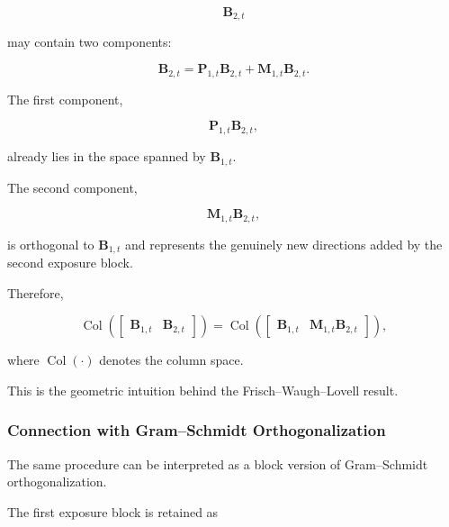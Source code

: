 \documentclass[11pt,a4paper]{article}
\begin{document}
\begin{equation}
\mathbf{B}_{2,t}
\end{equation}

may contain two components:

\begin{equation}
\boxed{
\mathbf{B}_{2,t}
=
\mathbf{P}_{1,t}
\mathbf{B}_{2,t}
+
\mathbf{M}_{1,t}
\mathbf{B}_{2,t}.
}
\end{equation}

The first component,

\begin{equation}
\mathbf{P}_{1,t}
\mathbf{B}_{2,t},
\end{equation}

already lies in the space spanned by $\mathbf{B}_{1,t}$.

The second component,

\begin{equation}
\boxed{
\mathbf{M}_{1,t}
\mathbf{B}_{2,t},
}
\end{equation}

is orthogonal to $\mathbf{B}_{1,t}$ and represents the genuinely new directions
added by the second exposure block.

Therefore,

\begin{equation}
\boxed{
\operatorname{Col}
\left(
\begin{bmatrix}
\mathbf{B}_{1,t}
&
\mathbf{B}_{2,t}
\end{bmatrix}
\right)
=
\operatorname{Col}
\left(
\begin{bmatrix}
\mathbf{B}_{1,t}
&
\mathbf{M}_{1,t}\mathbf{B}_{2,t}
\end{bmatrix}
\right),
}
\end{equation}

where $\operatorname{Col}(\cdot)$ denotes the column space.

This is the geometric intuition behind the Frisch--Waugh--Lovell result.


\subsubsection{Connection with Gram--Schmidt Orthogonalization}

The same procedure can be interpreted as a block version of Gram--Schmidt
orthogonalization.

The first exposure block is retained as
\end{document}
